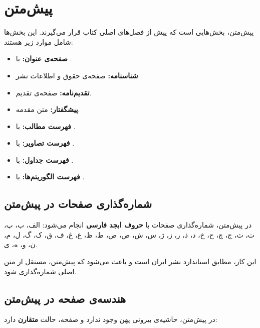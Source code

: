 
\section{پیش‌متن}
\label{sec:book-structure-frontmatter}

پیش‌متن، بخش‌هایی است که پیش از فصل‌های اصلی
کتاب قرار می‌گیرند. این بخش‌ها شامل موارد زیر
هستند:

\begin{itemize}
    \item \textbf{صفحه‌ی عنوان:} با .
    \item \textbf{شناسنامه:} صفحه‌ی حقوق و
    اطلاعات نشر.
    \item \textbf{تقدیم‌نامه:} صفحه‌ی تقدیم.
    \item \textbf{پیشگفتار:} متن مقدمه.
    \item \textbf{فهرست مطالب:} با
    .
    \item \textbf{فهرست تصاویر:} با
    .
    \item \textbf{فهرست جداول:} با
    .
    \item \textbf{فهرست الگوریتم‌ها:} با
    .
\end{itemize}

\subsection{شماره‌گذاری صفحات در پیش‌متن}
\label{sec:book-structure-frontmatter-numbering}

در پیش‌متن، شماره‌گذاری صفحات با \textbf{حروف
ابجد فارسی} انجام می‌شود: الف، ب، پ، ت، ث، ج،
چ، ح، خ، د، ذ، ر، ز، ژ، س، ش، ص، ض، ط، ظ، ع،
غ، ف، ق، ک، گ، ل، م، ن، و، ه، ی.

این کار، مطابق استاندارد نشر ایران است و باعث
می‌شود که پیش‌متن، مستقل از متن اصلی شماره‌گذاری
شود.


\subsection{هندسه‌ی صفحه در پیش‌متن}
\label{sec:book-structure-frontmatter-geometry}

در پیش‌متن، حاشیه‌ی بیرونی پهن وجود ندارد و
صفحه، حالت \textbf{متقارن} دارد:

